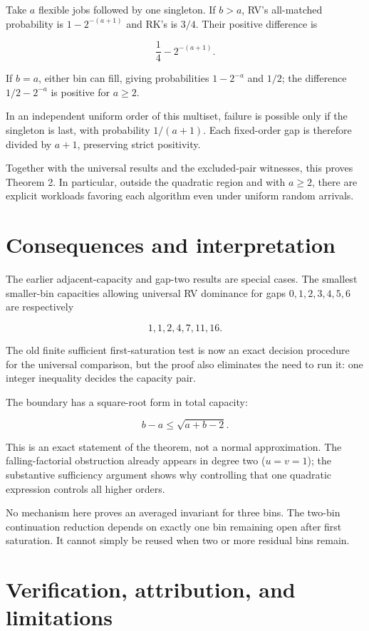 Take \(a\) flexible jobs followed by one singleton. If \(b>a\), RV's all-matched probability is \(1-2^{-(a+1)}\) and RK's is \(3/4\). Their positive difference is

\[
\frac14-2^{-(a+1)}.
\]

If \(b=a\), either bin can fill, giving probabilities \(1-2^{-a}\) and \(1/2\); the difference \(1/2-2^{-a}\) is positive for \(a\ge 2\).

In an independent uniform order of this multiset, failure is possible only if the singleton is last, with probability \(1/(a+1)\). Each fixed-order gap is therefore divided by \(a+1\), preserving strict positivity.

Together with the universal results and the excluded-pair witnesses, this proves Theorem 2. In particular, outside the quadratic region and with \(a\ge 2\), there are explicit workloads favoring each algorithm even under uniform random arrivals.

\section{Consequences and interpretation}\label{consequences-and-interpretation}

The earlier adjacent-capacity and gap-two results are special cases. The smallest smaller-bin capacities allowing universal RV dominance for gaps \(0,1,2,3,4,5,6\) are respectively

\[
1,1,2,4,7,11,16.
\]

The old finite sufficient first-saturation test is now an exact decision procedure for the universal comparison, but the proof also eliminates the need to run it: one integer inequality decides the capacity pair.

The boundary has a square-root form in total capacity:

\[
b-a\le\sqrt{a+b-2}.
\]

This is an exact statement of the theorem, not a normal approximation. The falling-factorial obstruction already appears in degree two (\(u=v=1\)); the substantive sufficiency argument shows why controlling that one quadratic expression controls all higher orders.

No mechanism here proves an averaged invariant for three bins. The two-bin continuation reduction depends on exactly one bin remaining open after first saturation. It cannot simply be reused when two or more residual bins remain.

\section{Verification, attribution, and limitations}\label{verification-attribution-and-limitations}

